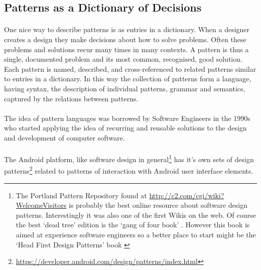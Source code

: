 \subsection{Patterns as a Dictionary of Decisions}
\paragraph{} One nice way to describe patterns is as entries in a dictionary. When a designer creates a design they make decisions about how to solve problems. Often these problems and solutions recur many times in many contexts. A pattern is thus a single, documented problem and its most common, recognised, good solution. Each pattern is named, described, and cross-referenced to related patterns similar to entries in a dictionary. In this way the collection of patterns form a language, having syntax, the description of individual patterns, grammar and semantics, captured by the relations between patterns.

\paragraph{} The idea of pattern languages was borrowed by Software Engineers in the 1990s who started applying the idea of recurring and reusable solutions to the design and development of computer software.

\paragraph{} The Android platform, like software design in general\footnote{The Portland Pattern Repository found at \url{http://c2.com/cgi/wiki?WelcomeVisitors} is probably the best online resource about software design patterns. Interestingly it was also one of the first Wikis on the web. Of course the best `dead tree' edition is the `gang of four book' \cite{gamma_1994_design.patterns}. However this book is aimed at experience software engineers so a better place to start might be the `Head First Design Patterns' book \cite{freeman_2004_head.first.design.patterns}} has it's own sets of design patterns\footnote{\url{https://developer.android.com/design/patterns/index.html}} related to patterns of interaction with Android user interface elements.



